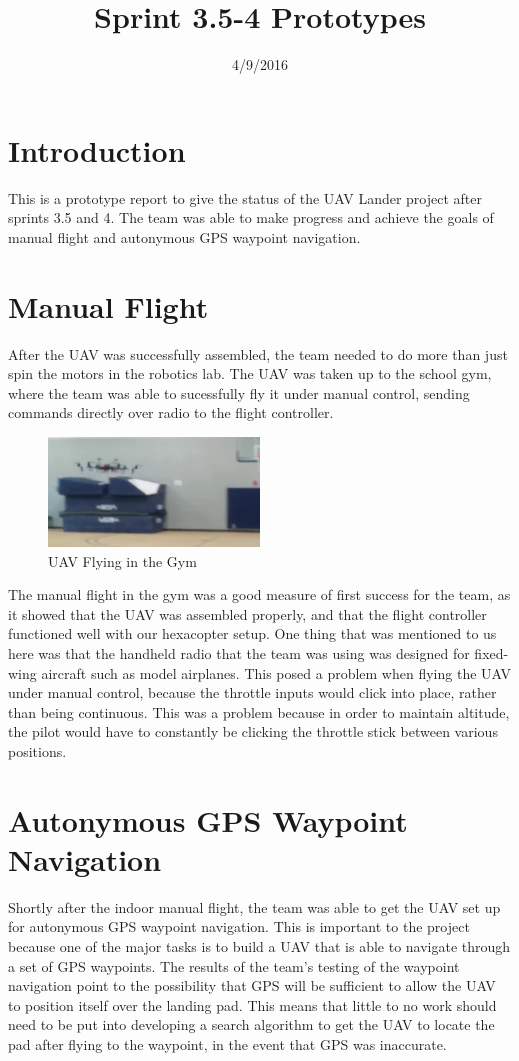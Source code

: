 \documentclass{article}
\title{Sprint 3.5-4 Prototypes}
\date{4/9/2016}
\begin{document}
	\maketitle
	\newpage
	
	\section{Introduction}
	This is a prototype report to give the status of the UAV Lander project after sprints 3.5 and 4. The team was able to make progress and achieve the goals of manual flight and autonymous GPS waypoint navigation.
	
	\section{Manual Flight}
	After the UAV was successfully assembled, the team needed to do more than just spin the motors in the robotics lab. The UAV was taken up to the school gym, where the team was able to sucessfully fly it under manual control, sending commands directly over radio to the flight controller.
	
	\begin{figure}[h]
		\centering
		\includegraphics[width=0.5\textwidth]{gym.png}
		\caption{UAV Flying in the Gym}
	\end{figure}
	
	The manual flight in the gym was a good measure of first success for the team, as it showed that the UAV was assembled properly, and that the flight controller functioned well with our hexacopter setup. One thing that was mentioned to us here was that the handheld radio that the team was using was designed for fixed-wing aircraft such as model airplanes. This posed a problem when flying the UAV under manual control, because the throttle inputs would click into place, rather than being continuous. This was a problem because in order to maintain altitude, the pilot would have to constantly be clicking the throttle stick between various positions.
	
	\section{Autonymous GPS Waypoint Navigation}
	Shortly after the indoor manual flight, the team was able to get the UAV set up for autonymous GPS waypoint navigation. This is important to the project because one of the major tasks is to build a UAV that is able to navigate through a set of GPS waypoints. The results of the team's testing of the waypoint navigation point to the possibility that GPS will be sufficient to allow the UAV to position itself over the landing pad. This means that little to no work should need to be put into developing a search algorithm to get the UAV to locate the pad after flying to the waypoint, in the event that GPS was inaccurate.
	
\end{document}
